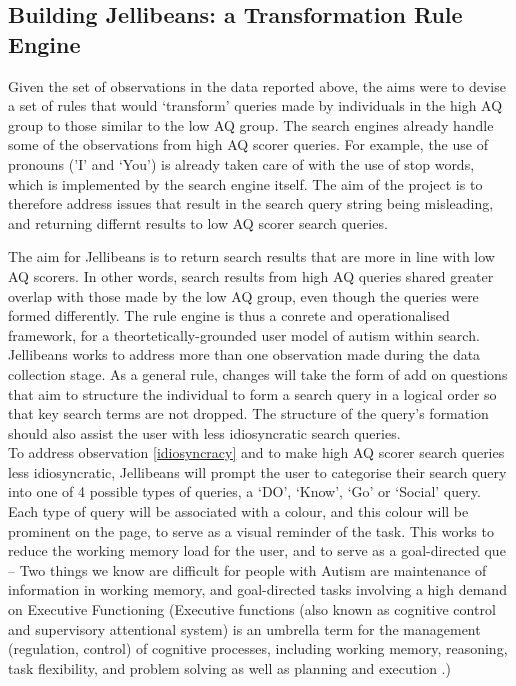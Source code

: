 \documentclass[a4paper, 11pt]{article}
\begin{document}
\subsection{Building Jellibeans: a Transformation Rule Engine}
Given the set of observations in the data reported above, the aims were to devise a set of rules that would `transform' queries made by individuals in the high AQ group to those similar to the low AQ group. The search engines already handle some of the observations from high AQ scorer queries. For example, the use of pronouns ('I' and `You') is already taken care of with the use of stop words, which is implemented by the search engine itself. The aim of the project is to therefore address issues that result in the search query string being misleading, and returning differnt results to low AQ scorer search queries. 


The aim for Jellibeans is to return search results that are more in line with low AQ scorers. In other words, search results from high AQ queries shared greater overlap with those made by the low AQ group, even though the queries were formed differently. The rule engine is thus a conrete and operationalised framework, for a theortetically-grounded user model of autism within search. \\

\vspace{5mm} %
Jellibeans works to address more than one observation made during the data collection stage. As a general rule, changes will take the form of add on questions that aim to structure the individual to form a search query in a logical order so that key search terms are not dropped. The structure of the query's formation should also assist the user with less idiosyncratic search queries. \\

\vspace{5mm} %
To address observation \ref{idiosyncracy} and to make high AQ scorer search queries less idiosyncratic, Jellibeans will prompt the user to categorise their search query into one of 4 possible types of queries, a `DO', `Know', `Go' or `Social' query. Each type of query will be associated with a colour, and this colour will be prominent on the page, to serve as a visual reminder of the task. This works to reduce the working memory load for the user, and to serve as a goal-directed que -- Two things we know are difficult for people with Autism are maintenance of information in working memory, and goal-directed tasks involving a high demand on Executive Functioning (Executive functions (also known as cognitive control and supervisory attentional system) is an umbrella term for the management (regulation, control) of cognitive processes, including working memory, reasoning, task flexibility, and problem solving as well as planning and execution \cite{EF}.) 
\end{document}
